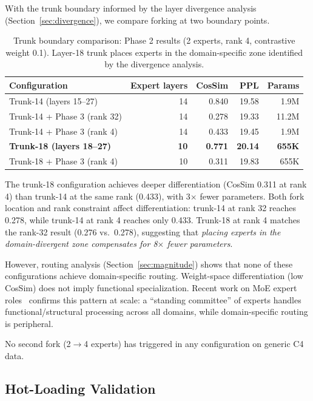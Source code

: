 \documentclass{article}
\begin{document}
With the trunk boundary informed by the layer divergence analysis
(Section~\ref{sec:divergence}), we compare forking at two boundary points.

\begin{table}[h]
\centering
\caption{Trunk boundary comparison: Phase 2 results (2 experts, rank 4,
contrastive weight 0.1). Layer-18 trunk places experts in the domain-specific
zone identified by the divergence analysis.}
\label{tab:trunk-comparison}
\begin{tabular}{@{}lrrrr@{}}
\toprule
Configuration & Expert layers & CosSim & PPL & Params \\
\midrule
Trunk-14 (layers 15--27) & 14 & 0.840 & 19.58 & 1.9M \\
Trunk-14 + Phase 3 (rank 32) & 14 & 0.278 & 19.33 & 11.2M \\
Trunk-14 + Phase 3 (rank 4) & 14 & 0.433 & 19.45 & 1.9M \\
\textbf{Trunk-18 (layers 18--27)} & \textbf{10} & \textbf{0.771} & \textbf{20.14} & \textbf{655K} \\
Trunk-18 + Phase 3 (rank 4) & 10 & 0.311 & 19.83 & 655K \\
\bottomrule
\end{tabular}
\end{table}

The trunk-18 configuration achieves deeper differentiation (CosSim 0.311 at
rank 4) than trunk-14 at the same rank (0.433), with 3$\times$ fewer
parameters. Both fork location and rank constraint affect differentiation:
trunk-14 at rank 32 reaches 0.278, while trunk-14 at rank 4 reaches only
0.433. Trunk-18 at rank 4 matches the rank-32 result (0.276 vs.\ 0.278),
suggesting that \emph{placing experts in the domain-divergent zone compensates
for 8$\times$ fewer parameters}.

However, routing analysis (Section~\ref{sec:magnitude}) shows that none of
these configurations achieve domain-specific routing. Weight-space
differentiation (low CosSim) does not imply functional specialization. Recent
work on MoE expert roles~\cite{standing2026} confirms this pattern at scale:
a ``standing committee'' of experts handles functional/structural processing
across all domains, while domain-specific routing is peripheral.

No second fork (2$\to$4 experts) has triggered in any configuration on
generic C4 data.

\subsection{Hot-Loading Validation}
\label{sec:hotloading}
\end{document}
